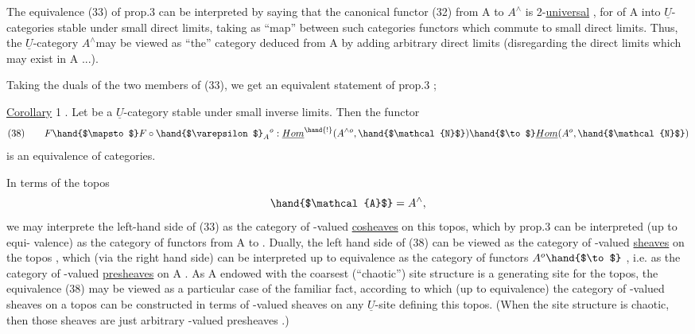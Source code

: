
The equivalence (33) of prop.3 can be interpreted by saying that the
 canonical functor (32) from A to $A^{\wedge}$ is 2-\uline{universal} , for  
of A into $\underline{U}$-categories stable under small direct limits, taking as ``map''
between such categories functors which commute to small direct limits.
Thus, the $\underline{U}$-category $A^{\wedge}$\hand{/}may be viewed as  ``the'' category deduced from
A by adding arbitrary direct limits (disregarding the direct limits which
may   exist in A ...).

Taking the duals of the two members of (33), we get  an equivalent
statement of prop.3 ; 

\uline{Corollary} 1 . Let  be a $\underline{U}$-category stable under small inverse limits.
Then the functor
\[ (38) \qquad F \hand{$\mapsto$} F \circ \hand{$\varepsilon$}_A{}^{o} : \underline{Hom}^{\hand{!}}(A^{\wedge o}, \hand{$\mathcal{N}$}) \hand{$\to$} \underline{Hom}(A^{o}, \hand{$\mathcal{N}$}) \]
is an equivalence of categories.

In terms of the topos
\[ \hand{$\mathcal{A}$} = A^{\wedge} , \]
we may interprete the left-hand side of (33) as the category of -valued
\uline{cosheaves} on this topos, which by prop.3 can be interpreted (up to equi-%
valence) as the category of functors from A to . Dually, the left
hand side of (38) can be viewed as the category of -valued \uline{sheaves} on
the topos , which (via the right hand side) can be interpreted up to
equivalence as the category of functors $A^{o} \hand{$\to$}$ , i.e. as the category of
-valued \uline{presheaves} on A . As A endowed with the coarsest (``chaotic'')
site structure is a generating site for the topos, the equivalence (38)
may be viewed as a particular case of the familiar fact, according to
which (up to equivalence) the category of -valued sheaves on a topos
can be constructed in terms of -valued sheaves on any $\underline{U}$-site defining
this topos. (When the site structure is chaotic, then those sheaves are
just arbitrary -valued presheaves .)

